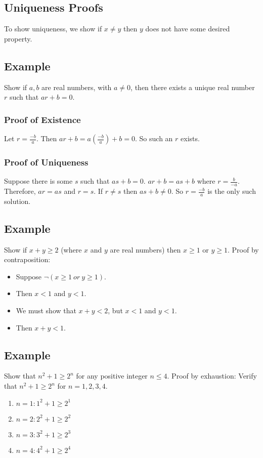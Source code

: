 \documentclass{math}
\begin{document}
\subsection*{Uniqueness Proofs}
To show uniqueness, we show if \( x \neq y \) then \( y \) does not have some
desired property.

\subsection*{Example}
Show if \( a,b \) are real numbers, with \( a \neq 0 \), then there exists a
unique real number \( r \) such that \( ar+b = 0 \).

\subsubsection*{Proof of Existence}
Let \( r = \frac{-b}{a} \). Then \( ar+b = a(\frac{-b}{a})+b = 0 \). So such an
\( r \) exists.

\subsubsection*{Proof of Uniqueness}
Suppose there is some \( s \) such that \( as+b = 0 \). \( ar+b = as+b \) where
\( r = \frac{b}{-a} \). Therefore, \( ar = as \) and \( r = s \). If
\( r \neq s \) then \( as+b \neq 0 \). So \( r = \frac{-b}{a} \) is the only
such solution.

\subsection*{Example}
Show if \( x + y \geq 2 \) (where \( x \) and \( y \) are real numbers) then
\( x \geq 1 \) or \( y \geq 1 \). Proof by contraposition:
\begin{itemize}
  \item Suppose \( \neg{(x \geq 1\ or\ y \geq 1)} \).
  \item Then \( x < 1 \) and \( y < 1 \).
  \item We must show that \( x+y < 2 \), but \( x < 1 \) and \( y < 1 \).
  \item Then \( x+y < 1 \).
\end{itemize}

\subsection*{Example}
Show that \( n^{2}+1 \geq 2^{n} \) for any positive integer \( n \leq 4 \).
Proof by exhaustion: Verify that \( n^{2}+1 \geq 2^{n} \) for \( n = 1,2,3,4 \).
\begin{enumerate}
  \item \( n = 1: 1^{2}+1 \geq 2^{1} \)
  \item \( n = 2: 2^{2}+1 \geq 2^{2} \)
  \item \( n = 3: 3^{2}+1 \geq 2^{3} \)
  \item \( n = 4: 4^{2}+1 \geq 2^{4} \)
\end{enumerate}
\end{document}
